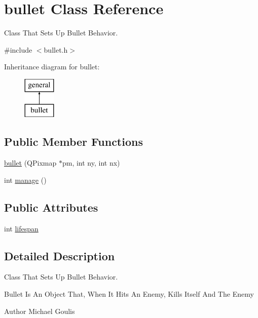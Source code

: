 \hypertarget{classbullet}{\section{bullet \-Class \-Reference}
\label{classbullet}
}


\-Class \-That \-Sets \-Up \-Bullet \-Behavior.  




{\ttfamily \#include $<$bullet.\-h$>$}

\-Inheritance diagram for bullet\-:\begin{figure}[H]
\begin{center}
\leavevmode
\includegraphics[height=2.000000cm]{classbullet}
\end{center}
\end{figure}
\subsection*{\-Public \-Member \-Functions}
\begin{DoxyCompactItemize}
\item 
\hyperlink{classbullet_aa62b1de309924a5a2daeb9ce7162068a}{bullet} (\-Q\-Pixmap $\ast$pm, int ny, int nx)
\item 
int \hyperlink{classbullet_ae06a08d3012aec0b8454d2df38284cd0}{manage} ()
\end{DoxyCompactItemize}
\subsection*{\-Public \-Attributes}
\begin{DoxyCompactItemize}
\item 
int \hyperlink{classbullet_ad9834658c10d040ea1307a1289ff715c}{lifespan}
\end{DoxyCompactItemize}


\subsection{\-Detailed \-Description}
\-Class \-That \-Sets \-Up \-Bullet \-Behavior. 

\-Bullet \-Is \-An \-Object \-That, \-When \-It \-Hits \-An \-Enemy, \-Kills \-Itself \-And \-The \-Enemy \begin{DoxyAuthor}{\-Author}
\-Michael \-Goulis 
\end{DoxyAuthor}


